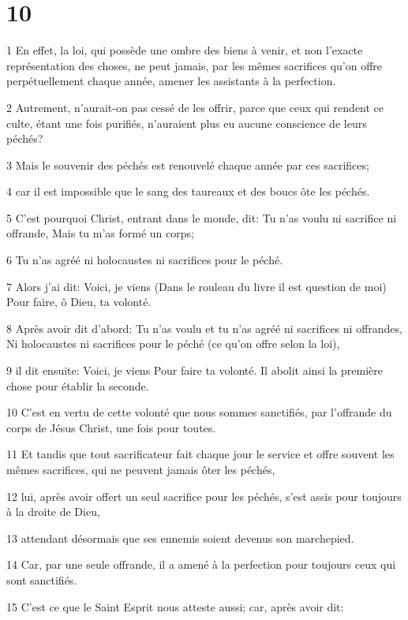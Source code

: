 \chapter{10}

\par 1 En effet, la loi, qui possède une ombre des biens à venir, et non l'exacte représentation des choses, ne peut jamais, par les mêmes sacrifices qu'on offre perpétuellement chaque année, amener les assistants à la perfection.
\par 2 Autrement, n'aurait-on pas cessé de les offrir, parce que ceux qui rendent ce culte, étant une fois purifiés, n'auraient plus eu aucune conscience de leurs péchés?
\par 3 Mais le souvenir des péchés est renouvelé chaque année par ces sacrifices;
\par 4 car il est impossible que le sang des taureaux et des boucs ôte les péchés.
\par 5 C'est pourquoi Christ, entrant dans le monde, dit: Tu n'as voulu ni sacrifice ni offrande, Mais tu m'as formé un corps;
\par 6 Tu n'as agréé ni holocaustes ni sacrifices pour le péché.
\par 7 Alors j'ai dit: Voici, je viens (Dans le rouleau du livre il est question de moi) Pour faire, ô Dieu, ta volonté.
\par 8 Après avoir dit d'abord: Tu n'as voulu et tu n'as agréé ni sacrifices ni offrandes, Ni holocaustes ni sacrifices pour le péché (ce qu'on offre selon la loi),
\par 9 il dit ensuite: Voici, je viens Pour faire ta volonté. Il abolit ainsi la première chose pour établir la seconde.
\par 10 C'est en vertu de cette volonté que nous sommes sanctifiés, par l'offrande du corps de Jésus Christ, une fois pour toutes.
\par 11 Et tandis que tout sacrificateur fait chaque jour le service et offre souvent les mêmes sacrifices, qui ne peuvent jamais ôter les péchés,
\par 12 lui, après avoir offert un seul sacrifice pour les péchés, s'est assis pour toujours à la droite de Dieu,
\par 13 attendant désormais que ses ennemis soient devenus son marchepied.
\par 14 Car, par une seule offrande, il a amené à la perfection pour toujours ceux qui sont sanctifiés.
\par 15 C'est ce que le Saint Esprit nous atteste aussi; car, après avoir dit:
